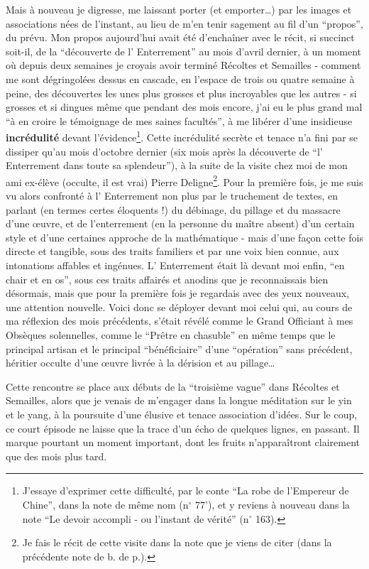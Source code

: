 Mais à nouveau je digresse, me laissant porter (et emporter\ldots) par les images et associations nées de l'instant, au lieu de m'en tenir sagement au fil d'un ``propos'', du prévu. Mon propos aujourd'hui avait été d'enchaîner avec le récit, si succinct soit-il, de la ``découverte de l' Enterrement'' au mois d'avril dernier, à un moment où depuis deux semaines je croyais avoir terminé Récoltes et Semailles - comment me sont dégringolées dessus en cascade, en l'espace de trois ou quatre semaine à peine, des découvertes les unes plus grosses et plus incroyables que les autres - si grosses et si dingues même que pendant des mois encore, j'ai eu le plus grand mal ``à en croire le témoignage de mes saines facultés'', à me libérer d'une insidieuse \textbf{incrédulité} devant l'évidence\footnote{J'essaye d'exprimer cette difficulté, par le conte ``La robe de l'Empereur de Chine'', dans la note de même nom (n$^{\circ}$ 77'), et y reviens à nouveau dans la note ``Le devoir accompli - ou l'instant de vérité'' (n$^{\circ}$ 163).}. Cette incrédulité secrète et tenace n'a fini par se dissiper qu'au mois d'octobre dernier (six mois après la découverte de ``l' Enterrement dans toute sa splendeur''), à la suite de la visite chez moi de mon ami ex-élève (occulte, il est vrai) Pierre Deligne\footnote{Je fais le récit de cette visite dans la note que je viens de citer (dans la précédente note de b. de p.).}. Pour la première fois, je me suis vu alors confronté à l' Enterrement non plus par le truchement de textes, en parlant (en termes certes éloquents !) du débinage, du pillage et du massacre d'une œuvre, et de l'enterrement (en la personne du maître absent) d'un certain style et d'une certaines approche de la mathématique - mais d'une façon cette fois directe et tangible, sous des traits familiers et par une voix bien connue, aux intonations affables et ingénues. L' Enterrement était là devant moi enfin, ``en chair et en os'', sous ces traits affairés et anodins que je reconnaissais bien désormais, mais que pour la première fois je regardais avec des yeux nouveaux, une attention nouvelle. Voici donc se déployer devant moi celui qui, au cours de ma réflexion des mois précédents, s'était révélé comme le Grand Officiant à mes Obsèques solennelles, comme le ``Prêtre en chasuble'' en même temps que le principal artisan et le principal ``bénéficiaire'' d'une ``opération'' sans précédent, héritier occulte d'une œuvre livrée à la dérision et au pillage\ldots

Cette rencontre se place aux débuts de la ``troisième vague'' dans Récoltes et Semailles, alors que je venais de m'engager dans la longue méditation sur le yin et le yang, à la poursuite d'une élusive et tenace association d'idées. Sur le coup, ce court épisode ne laisse que la trace d'un écho de quelques lignes, en passant. Il marque pourtant un moment important, dont les fruits n'apparaîtront clairement que des mois plus tard.

